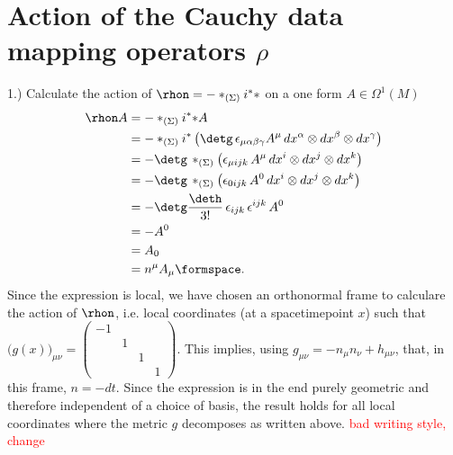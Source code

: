 \section{Action of the Cauchy data mapping operators $\rho$}
\label{app:rho_operators}
1.) Calculate the action of $\rhon = -*_{(\Sigma)} {i^* *}$ on a one form $A \in \Omega^1(M)$
\begin{align}
\rhon A 
&=  -*_{(\Sigma)} {i^* *} A \\
&= -*_{(\Sigma)} i^* \left( \detg \, \epsilon_{\mu \alpha \beta \gamma} A^\mu \, dx^\alpha \otimes dx^\beta \otimes dx^\gamma \right)  \\
&= -\detg \, *_{(\Sigma)} \left( \epsilon_{\mu ijk} \, A^\mu \, dx^i \otimes dx^j \otimes dx^k \right) \\
&= -\detg \, *_{(\Sigma)} \left( \epsilon_{0 ijk} \, A^0 \, dx^i \otimes dx^j \otimes dx^k \right) \\
&= - \detg \frac{\deth}{3!}\,  \epsilon_{ijk} \, \epsilon^{ijk} \,A^0 \\
&= -A^0 \\
&= A_0 \\
&= n^\mu A_\mu \formspace.
\end{align}
Since the expression is local, we have chosen an orthonormal frame to calculare the action of $\rhon$, i.e. local coordinates (at a spacetimepoint $x$) such that $\big(g(x)\big)_{\mu\nu} = \begin{pmatrix}
-1 & & & \\
  & 1 & & \\
  & & 1 & \\
  & & & 1
\end{pmatrix}$. This implies, using $g_{\mu\nu} = -n_\mu n_\nu + h_{\mu \nu}$, that, in this frame, $n= - dt$. Since the expression is in the end purely geometric and therefore independent of a choice of basis, the result holds for all local coordinates where the metric $g$ decomposes as written above.
\textcolor{red}{bad writing style, change}
